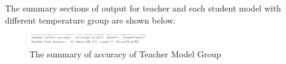 \documentclass[conference]{IEEEtran}
\begin{document}
The summary sections of output for teacher and each student model with different temperature group are shown below.

\begin{figure}[hbtp] 
    \centering
    \includegraphics[width=0.45\textwidth]{./graphs/Task2/teacher_acc.png}
    \caption{The summary of accuracy of Teacher Model Group}
    \label{sum-te}
\end{figure}

%
%
%
%
%
\end{document}
